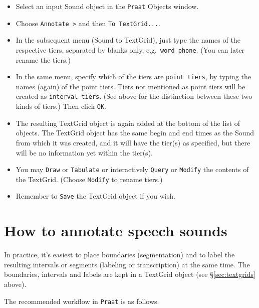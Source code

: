 \documentclass[
]{book}
\begin{document}
\begin{itemize}
\item
  Select an input Sound object in the \texttt{Praat} Objects window.
\item
  Choose \texttt{Annotate\ \textgreater{}} and then \texttt{To\ TextGrid...}.
\item
  In the subsequent menu (Sound to TextGrid), just type the names of the respective tiers, separated by blanks only, e.g.~\texttt{word\ phone}. (You can later rename the tiers.)
\item
  In the same menu, specify which of the tiers are \texttt{point\ tiers}, by typing the names (again) of the point tiers. Tiers not mentioned as point tiers will be created as \texttt{interval\ tiers}. (See above for the distinction between these two kinds of tiers.) Then click \texttt{OK}.
\item
  The resulting TextGrid object is again added at the bottom of the list of objects. The TextGrid object has the same begin and end times as the Sound from which it was created, and it will have the tier(s) as specified, but there will be no information yet within the tier(s).
\item
  You may \texttt{Draw} or \texttt{Tabulate} or interactively \texttt{Query} or \texttt{Modify} the contents of the TextGrid. (Choose \texttt{Modify} to rename tiers.)
\item
  Remember to \texttt{Save} the TextGrid object if you wish.
\end{itemize}

\section{How to annotate speech sounds}\label{sec:howtoannotate}

In practice, it's easiest to place boundaries (segmentation) and to label the resulting intervals or segments (labeling or transcription) at the same time. The boundaries, intervals and labels are kept in a TextGrid object (see §\ref{sec:textgrids} above).

\protect{}\label{box-praattextgrideditor}
The recommended workflow in \texttt{Praat} is as follows.
\end{document}
